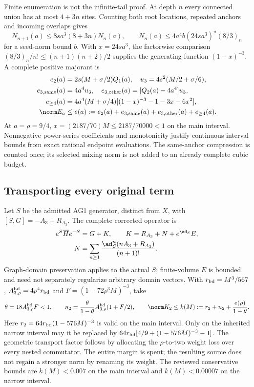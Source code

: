 Finite enumeration is not the infinite-tail proof. At depth $n$ every connected union has at most $4+3n$ sites. Counting both root locations, repeated anchors and incoming overlaps gives
\begin{equation}
N_{n+1}(a)\le8sa^3(8+3n)N_n(a),\qquad
N_n(a)\le4a^4b(24sa^3)^n(8/3)_n
\label{r28:ag2:recurrence}
\end{equation}
for a seed-norm bound $b$. With $x=24sa^3$, the factorwise comparison
$(8/3)_n/n!\le(n+1)(n+2)/2$ supplies the generating function $(1-x)^{-3}$. A complete positive majorant is
\begin{align}
e_2(a)&=2s(M+\sigma/2)Q_1(a),\quad u_3=4s^2(M/2+\sigma/6),\nonumber\\
e_{3,\rm same}(a)&=4a^4u_3,\quad e_{3,\rm other}(a)=[Q_2(a)-4a^4]u_3,\nonumber\\
e_{\ge4}(a)&=4a^4(M+\sigma/4)[(1-x)^{-3}-1-3x-6x^2],\nonumber\\
\norm E_a&\le e(a):=e_2(a)+e_{3,\rm same}(a)+e_{3,\rm other}(a)+e_{\ge4}(a).
\label{r28:ag2:majorant}
\end{align}
At $a=\rho=9/4$, $x=(2187/70)M\le2187/70000<1$ on the main interval. Nonnegative power-series coefficients and monotonicity justify continuous interval bounds from exact rational endpoint evaluations. The same-anchor compression is counted once; its selected mixing norm is not added to an already complete cubic budget.

\subsection{Transporting every original term}
Let $S$ be the admitted AG1 generator, distinct from $X$, with $[S,G]=-A_3+R_{A_3}$. The complete corrected operator is
\begin{align}
e^S\overline He^{-S}&=G+K,\qquad
K=R_{A_3}+N+e^{\ad_S}E,\nonumber\\
N&=\sum_{n\ge1}\frac{\ad_S^n(nA_3+R_{A_3})}{(n+1)!}.
\label{r28:ag2:transport}
\end{align}
Graph-domain preservation applies to the actual $S$; finite-volume $E$ is bounded and need not separately regularize arbitrary domain vectors. With $r_{\rm bd}=M^3/567$, $A_{3,\rho}^{\rm bd}=4\rho^4r_{\rm bd}$ and $F=(1-72\rho^3M)^{-3}$, take
\begin{equation}
\theta=18A_{3,\rho}^{\rm bd}F<1,\qquad
n_2=\frac{\theta}{1-\theta}A_{3,\rho}^{\rm bd}(1+F/2),\qquad
\norm K_2\le k(M):=r_2+n_2+\frac{e(\rho)}{1-\theta}.
\label{r28:ag2:k}
\end{equation}
Here $r_2=64r_{\rm bd}(1-576M)^{-3}$ is valid on the main interval. Only on the inherited narrow interval may it be replaced by
$64r_{\rm bd}[4/9+(1-576M)^{-3}-1]$. The geometric transport factor follows by allocating the $\rho$-to-two weight loss over every nested commutator. The entire margin is spent; the resulting source does not regain a stronger norm by renaming its weight. The reviewed conservative bounds are $k(M)<0.007$ on the main interval and $k(M)<0.00007$ on the narrow interval.


